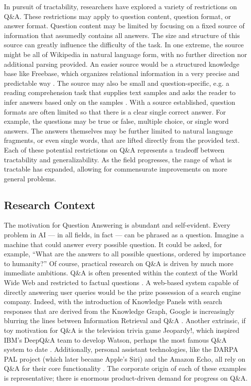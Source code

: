 In pursuit of tractability, researchers have explored a variety of restrictions on Q\&A. These restrictions may apply to question content, question format, or answer format. Question content may be limited by focusing on a fixed source of information that assumedly contains all answers. The size and structure of this source can greatly influence the difficulty of the task. In one extreme, the source might be all of Wikipedia in natural language form, with no further direction nor additional parsing provided. An easier source would be a structured knowledge base like Freebase, which organizes relational information in a very precise and predictable way \citep{bollacker2008freebase}. The source may also be small and question-specific, e.g. a reading comprehension task that supplies text samples and asks the reader to infer answers based only on the samples \citep{richardson2013mctest}. With a source established, question formats are often limited so that there is a clear single correct answer. For example, the questions may be true or false, multiple choice, or single word answers. The answers themselves may be further limited to natural language fragments, or even single words, that are lifted directly from the provided text. Each of these potential restrictions on Q\&A represents a tradeoff between tractability and generalizability. As the field progresses, the range of what is tractable has expanded, allowing for commensurate improvements on more general problems.

\subsection{Research Context}

The motivation for Question Answering is abundant and self-evident. Every problem in AI --- in all fields, in fact --- can be phrased as a question. Imagine a machine that could answer every possible question. It could be asked, for example, ``What are the answers to all possible questions, ordered by importance to humanity?'' Of course, practical research on Q\&A is driven by much more immediate ambitions. Q\&A is often presented within the context of the World Wide Web and restricted to factual questions \citep{cucerzan2005factoid, ravichandran2002learning, kwok2001scaling}. A web-based system capable of directly answering user queries would be the prize possession of a search engine company. Indeed, with the introduction of Knowledge Panels with search responses that are derived from the Knowledge Graph, Google is increasingly blurring the lines between Information Retrieval and Q\&A \citep{singhal2012introducing}. Another extrinsic, if toy motivation for Q\&A is the television trivia game Jeopardy!, which inspired IBM's DeepQ\&A team to develop Watson, perhaps the most famous Q\&A system to date \citep{ferrucci2012introduction}. Additionally, personal assistant technologies, like the DARPA PAL project (which later became Apple's Siri) and the Amazon Echo, all rely on Q\&A for their core functionality \citep{aron2011innovative, tsiao2007natural}. The corporate origin of each of these examples is representative; there is enormous product-driven demand for progress on Q\&A.

